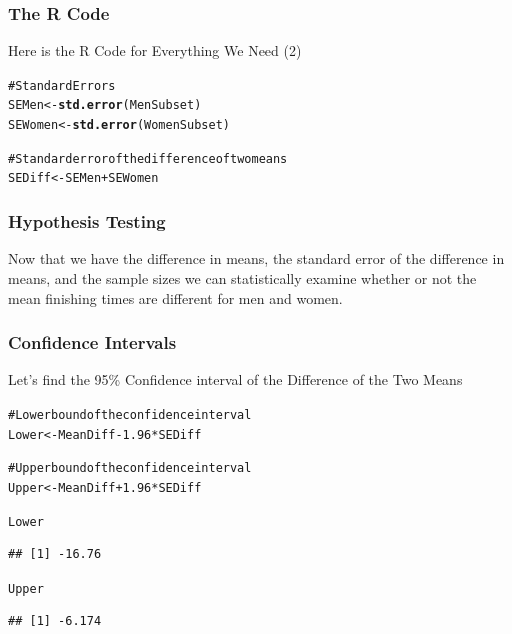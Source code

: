 \documentclass{beamer}\usepackage{graphicx, color}
\makeatletter
\newcommand{\hlfunctioncall}[1]{\textcolor[rgb]{0.501960784313725,0,0.329411764705882}{\textbf{#1}}}%
\newcommand{\hlcomment}[1]{\textcolor[rgb]{0.180392156862745,0.6,0.341176470588235}{#1}}%
\newenvironment{kframe}{%
 \def\at@end@of@kframe{}%
 \ifinner\ifhmode%
  \def\at@end@of@kframe{\end{minipage}}%
  \begin{minipage}{\columnwidth}%
 \fi\fi%
 \def\FrameCommand##1{\hskip\@totalleftmargin \hskip-\fboxsep
 \colorbox{shadecolor}{##1}\hskip-\fboxsep
     \hskip-\linewidth \hskip-\@totalleftmargin \hskip\columnwidth}%
 \MakeFramed {\advance\hsize-\width
   \@totalleftmargin\z@ \linewidth\hsize
   \@setminipage}}%
 {\par\unskip\endMakeFramed%
 \at@end@of@kframe}
\newenvironment{knitrout}{}{} %
\makeatother
\begin{document}
\begin{frame}[fragile]
  \frametitle{The R Code}
{\Large{Here is the R Code for Everything We Need (2)}}
\begin{knitrout}
\color{fgcolor}\begin{kframe}
\begin{alltt}
\hlcomment{# Standard Errors}
SEMen <- \hlfunctioncall{std.error}(MenSubset)
SEWomen <- \hlfunctioncall{std.error}(WomenSubset)

\hlcomment{# Standard error of the difference of two means}
SEDiff <- SEMen + SEWomen
\end{alltt}
\end{kframe}
\end{knitrout}

\end{frame}

\begin{frame}[fragile]
  \frametitle{Hypothesis Testing}
{\Large{Now that we have the difference in means, the standard error of the difference in means, and the sample sizes we can statistically examine whether or not the mean finishing times are different for men and women.}}
\end{frame}

\begin{frame}[fragile]
  \frametitle{Confidence Intervals}
{\Large{Let's find the 95\% Confidence interval of the Difference of the Two Means}}
\begin{knitrout}
\color{fgcolor}\begin{kframe}
\begin{alltt}
\hlcomment{# Lower bound of the confidence interval}
Lower <- MeanDiff - 1.96 * SEDiff

\hlcomment{# Upper bound of the confidence interval}
Upper <- MeanDiff + 1.96 * SEDiff

Lower
\end{alltt}
\begin{verbatim}
## [1] -16.76
\end{verbatim}
\begin{alltt}
Upper
\end{alltt}
\begin{verbatim}
## [1] -6.174
\end{verbatim}
\end{kframe}
\end{knitrout}

\end{frame}
\end{document}
